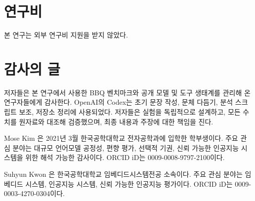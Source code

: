 \documentclass{ieeeaccess}
\begin{document}
\section*{연구비}
본 연구는 외부 연구비 지원을 받지 않았다.

\section*{감사의 글}
저자들은 본 연구에서 사용한 BBQ 벤치마크와 공개 모델 및 도구 생태계를 관리해 온 연구자들에게 감사한다. OpenAI의 Codex는 초기 문장 작성, 문체 다듬기, 분석 스크립트 보조, 저장소 정리에 사용되었다. 저자들은 실험을 독립적으로 설계하고, 모든 수치를 원자료와 대조해 검증했으며, 최종 내용과 주장에 대한 책임을 진다.




\begin{IEEEbiographynophoto}{Mose Kim}
은 2021년 3월 한국공학대학교 전자공학과에 입학한 학부생이다. 주요 관심 분야는 대규모 언어모델 공정성, 편향 평가, 선택적 기권, 신뢰 가능한 인공지능 시스템을 위한 해석 가능한 감사이다. ORCID iD는 0009-0008-9797-2100이다.
\end{IEEEbiographynophoto}

\begin{IEEEbiographynophoto}{Suhyun Kwon}
은 한국공학대학교 임베디드시스템전공 소속이다. 주요 관심 분야는 임베디드 시스템, 인공지능 시스템, 신뢰 가능한 인공지능 평가이다. ORCID iD는 0009-0003-4270-0304이다.
\end{IEEEbiographynophoto}

\EOD
\end{document}
